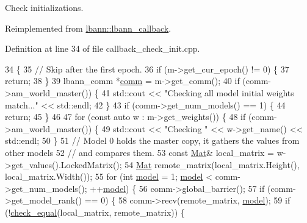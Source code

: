 Check initializations. 

Reimplemented from \hyperlink{classlbann_1_1lbann__callback_a7c8f0d211967ccc5219144e92571ab26}{lbann\+::lbann\+\_\+callback}.



Definition at line 34 of file callback\+\_\+check\+\_\+init.\+cpp.


\begin{DoxyCode}
34                                                        \{
35   \textcolor{comment}{// Skip after the first epoch.}
36   \textcolor{keywordflow}{if} (m->get\_cur\_epoch() != 0) \{
37     \textcolor{keywordflow}{return};
38   \}
39   lbann\_comm *\hyperlink{file__io_8cpp_ab048c6f9fcbcfaa57ce68b00263dbebe}{comm} = m->get\_comm();
40   \textcolor{keywordflow}{if} (comm->am\_world\_master()) \{
41     std::cout << \textcolor{stringliteral}{"Checking all model initial weights match..."} << std::endl;
42   \}
43   \textcolor{keywordflow}{if} (comm->get\_num\_models() == 1) \{
44     \textcolor{keywordflow}{return};
45   \}
46 
47   \textcolor{keywordflow}{for} (\textcolor{keyword}{const} \textcolor{keyword}{auto} w : m->get\_weights()) \{
48     \textcolor{keywordflow}{if} (comm->am\_world\_master()) \{
49       std::cout << \textcolor{stringliteral}{"Checking "} << w->get\_name() << std::endl;
50     \}
51     \textcolor{comment}{// Model 0 holds the master copy, it gathers the values from other models}
52     \textcolor{comment}{// and compares them.}
53     \textcolor{keyword}{const} \hyperlink{base_8hpp_a68f11fdc31b62516cb310831bbe54d73}{Mat}& local\_matrix = w->get\_values().LockedMatrix();
54     \hyperlink{base_8hpp_a68f11fdc31b62516cb310831bbe54d73}{Mat} remote\_matrix(local\_matrix.Height(), local\_matrix.Width());
55     \textcolor{keywordflow}{for} (\textcolor{keywordtype}{int} \hyperlink{namespacelbann_adee41f31f15f3906cbdcce4a1417eb56a20f35e630daf44dbfa4c3f68f5399d8c}{model} = 1; \hyperlink{namespacelbann_adee41f31f15f3906cbdcce4a1417eb56a20f35e630daf44dbfa4c3f68f5399d8c}{model} < comm->get\_num\_models(); ++\hyperlink{namespacelbann_adee41f31f15f3906cbdcce4a1417eb56a20f35e630daf44dbfa4c3f68f5399d8c}{model}) \{
56       comm->global\_barrier();
57       \textcolor{keywordflow}{if} (comm->get\_model\_rank() == 0) \{
58         comm->recv(remote\_matrix, \hyperlink{namespacelbann_adee41f31f15f3906cbdcce4a1417eb56a20f35e630daf44dbfa4c3f68f5399d8c}{model});
59         \textcolor{keywordflow}{if} (!\hyperlink{classlbann_1_1lbann__callback__check__init_a9a7a7cffe24967aae2b82d1668c2b87c}{check\_equal}(local\_matrix, remote\_matrix)) \{

\end{DoxyCode}
